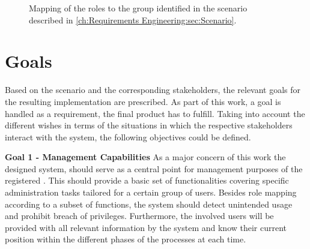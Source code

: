 \begin{figure}[h]
    \centering
    \caption{Mapping of the roles to the group identified in the scenario described in \ref{ch:Requirements Engineering:sec:Scenario}.}
    \label{fig:role-mapping}
\end{figure}

\newpage

\section{Goals}
\label{ch:Requirements Engineering:sec:Goals}

Based on the scenario and the corresponding stakeholders, the relevant goals for the resulting implementation are prescribed. As part of this work, a goal is handled as a requirement, the final product has to fulfill. 
Taking into account the different wishes in terms of the situations in which the respective stakeholders interact with the system, the following objectives could be defined.

\noindent \textbf{Goal 1 - Management Capabilities} As a major concern of this work the designed system, should serve as a central point for management purposes of the registered . This should provide a basic set of functionalities covering specific administration tasks tailored for a certain group of users. 
Besides role mapping according to a subset of functions, the system should detect unintended usage and prohibit breach of privileges.
Furthermore, the involved users will be provided with all relevant information by the system and know their current position within the different phases of the processes at each time. 

